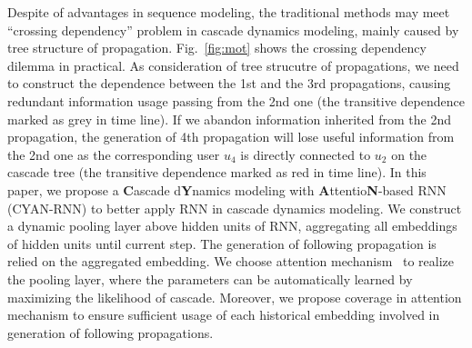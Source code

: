 Despite of advantages in sequence modeling, the traditional methods
may meet ``crossing dependency'' problem in cascade dynamics modeling, mainly
caused by
tree structure of propagation. Fig.~\ref{fig:mot} shows the crossing
dependency dilemma in practical. 
As consideration
of tree strucutre of propagations, we need to construct the dependence between
the 1st and the 3rd propagations, causing redundant information usage passing
from the 2nd one (the transitive dependence marked as grey in time
line). If we abandon information inherited from the 2nd propagation, the
generation of 4th propagation will lose useful information from the 2nd
one as the corresponding user $u_4$ is directly connected to $u_2$ on the
cascade tree
(the transitive dependence marked as red in time line). 
In this paper, we propose a \textbf{C}ascade d\textbf{Y}namics
modeling with \textbf{A}ttentio\textbf{N}-based RNN (CYAN-RNN) to better
apply RNN in cascade dynamics modeling. We construct a dynamic pooling
layer above hidden units of RNN, aggregating all embeddings of hidden units
until current step. The generation of following propagation is relied on the
aggregated embedding. 
We choose attention mechanism~\cite{bahdanau2014neural} to realize the pooling layer,
where the parameters can be automatically learned by maximizing the
likelihood of cascade. Moreover, we propose coverage in attention mechanism to
ensure sufficient usage of each historical embedding involved in generation of
following propagations.
